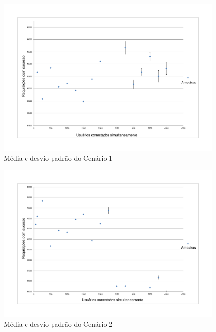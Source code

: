     \begin{figure}[H]
    \centering
    \includegraphics[scale=0.50]{imagens/dvp1.pdf}
    \caption{Média e desvio padrão do Cenário 1}
    \label{fig:dvp1}
    \end{figure}
    
        \begin{figure}[H]
    \centering
    \includegraphics[scale=0.5]{imagens/dvp2.pdf}
    \caption{Média e desvio padrão do Cenário 2}
    \label{fig:dvp2}
    \end{figure}
    
